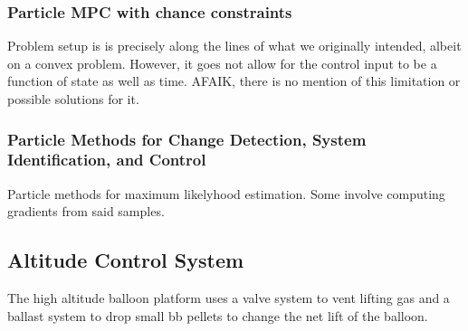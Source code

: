 \documentclass[11pt]{article}
\begin{document}
\subsubsection*{Particle MPC with chance constraints \cite{blackmore2010probabilistic}}
Problem setup is is precisely along the lines of what we originally intended, albeit on a convex problem. However, it goes not allow for the control input to be a function of state as well as time. AFAIK, there is no mention of this limitation or possible solutions for it.

\subsubsection*{Particle Methods for Change Detection, System
Identification, and Control \cite{andrieu2004particle}}
Particle methods for maximum likelyhood estimation. Some involve computing gradients from said samples.

\subsection*{Altitude Control System}

The high altitude balloon platform uses a valve system to vent lifting gas and a ballast system to drop small bb pellets to change the net lift of the balloon.



\end{document}
